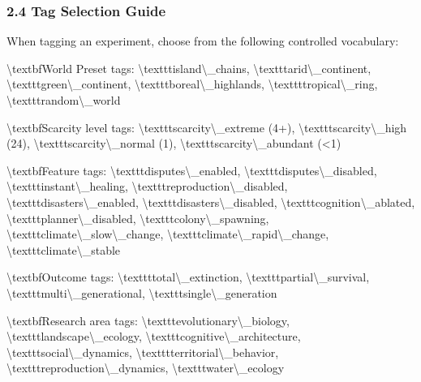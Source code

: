 \documentclass[11pt,a4paper]{article}
\begin{document}
\subsubsection*{2.4 Tag Selection Guide}

When tagging an experiment, choose from the following controlled vocabulary:

\textbackslash{}textbf{World Preset tags:}
\textbackslash{}texttt{island\textbackslash{}\_chains}, \textbackslash{}texttt{arid\textbackslash{}\_continent}, \textbackslash{}texttt{green\textbackslash{}\_continent}, \textbackslash{}texttt{boreal\textbackslash{}\_highlands}, \textbackslash{}texttt{tropical\textbackslash{}\_ring}, \textbackslash{}texttt{random\textbackslash{}\_world}

\textbackslash{}textbf{Scarcity level tags:}
\textbackslash{}texttt{scarcity\textbackslash{}\_extreme} (4+), \textbackslash{}texttt{scarcity\textbackslash{}\_high} (24), \textbackslash{}texttt{scarcity\textbackslash{}\_normal} (1), \textbackslash{}texttt{scarcity\textbackslash{}\_abundant} (\textless{}1)

\textbackslash{}textbf{Feature tags:}
\textbackslash{}texttt{disputes\textbackslash{}\_enabled}, \textbackslash{}texttt{disputes\textbackslash{}\_disabled}, \textbackslash{}texttt{instant\textbackslash{}\_healing}, \textbackslash{}texttt{reproduction\textbackslash{}\_disabled},
\textbackslash{}texttt{disasters\textbackslash{}\_enabled}, \textbackslash{}texttt{disasters\textbackslash{}\_disabled}, \textbackslash{}texttt{cognition\textbackslash{}\_ablated}, \textbackslash{}texttt{planner\textbackslash{}\_disabled},
\textbackslash{}texttt{colony\textbackslash{}\_spawning}, \textbackslash{}texttt{climate\textbackslash{}\_slow\textbackslash{}\_change}, \textbackslash{}texttt{climate\textbackslash{}\_rapid\textbackslash{}\_change}, \textbackslash{}texttt{climate\textbackslash{}\_stable}

\textbackslash{}textbf{Outcome tags:}
\textbackslash{}texttt{total\textbackslash{}\_extinction}, \textbackslash{}texttt{partial\textbackslash{}\_survival}, \textbackslash{}texttt{multi\textbackslash{}\_generational}, \textbackslash{}texttt{single\textbackslash{}\_generation}

\textbackslash{}textbf{Research area tags:}
\textbackslash{}texttt{evolutionary\textbackslash{}\_biology}, \textbackslash{}texttt{landscape\textbackslash{}\_ecology}, \textbackslash{}texttt{cognitive\textbackslash{}\_architecture},
\textbackslash{}texttt{social\textbackslash{}\_dynamics}, \textbackslash{}texttt{territorial\textbackslash{}\_behavior}, \textbackslash{}texttt{reproduction\textbackslash{}\_dynamics}, \textbackslash{}texttt{water\textbackslash{}\_ecology}
\end{document}
